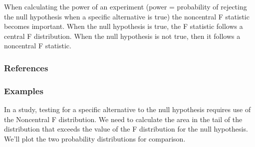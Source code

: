 \documentclass[letterpaper,10pt,english]{sphinxmanual}
\begin{document}
\begin{fulllineitems}
\sphinxAtStartPar
When calculating the power of an experiment (power = probability of
rejecting the null hypothesis when a specific alternative is true) the
non\sphinxhyphen{}central F statistic becomes important.  When the null hypothesis is
true, the F statistic follows a central F distribution. When the null
hypothesis is not true, then it follows a non\sphinxhyphen{}central F statistic.
\subsubsection*{References}
\subsubsection*{Examples}

\sphinxAtStartPar
In a study, testing for a specific alternative to the null hypothesis
requires use of the Noncentral F distribution. We need to calculate the
area in the tail of the distribution that exceeds the value of the F
distribution for the null hypothesis.  We’ll plot the two probability
distributions for comparison.


\end{fulllineitems}
\end{document}
